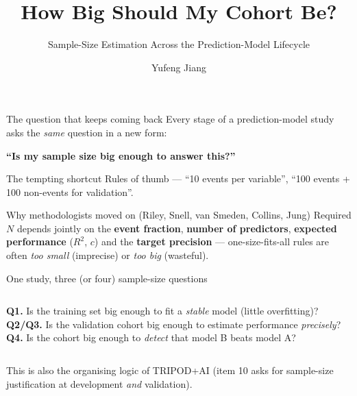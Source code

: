 \documentclass[10pt,aspectratio=169]{beamer}
\title{How Big Should My Cohort Be?}
\subtitle{Sample-Size Estimation Across the Prediction-Model Lifecycle}
\author{Yufeng Jiang}
\date{}
\institute{Binary-outcome clinical prediction models (e.g.\ pCR)}
\newcommand{\stagechip}[2]{\textcolor{#1}{\textbf{#2}}}
\begin{document}
\maketitle

\begin{frame}{The question that keeps coming back}
  Every stage of a prediction-model study asks the \emph{same} question in a new form:
  \begin{center}\Large\textbf{``Is my sample size big enough to answer this?''}\end{center}
  \pause
  \begin{alertblock}{The tempting shortcut}
    Rules of thumb --- ``10 events per variable'', ``100 events + 100 non-events for validation''.
  \end{alertblock}
  \pause
  \begin{block}{Why methodologists moved on (Riley, Snell, van Smeden, Collins, Jung)}
    Required $N$ depends jointly on the \textbf{event fraction}, \textbf{number of predictors},
    \textbf{expected performance} ($R^2$, $c$) and the \textbf{target precision} ---
    one-size-fits-all rules are often \emph{too small} (imprecise) or \emph{too big} (wasteful).
  \end{block}
\end{frame}

\begin{frame}{One study, three (or four) sample-size questions}
  \centering
  \vfill
  \begin{columns}[t]
    \footnotesize
      \stagechip{devcol}{Q1.} Is the training set big enough to fit a \emph{stable} model (little overfitting)?
    \footnotesize
      \stagechip{valcol}{Q2/Q3.} Is the validation cohort big enough to estimate performance \emph{precisely}?
    \footnotesize
      \stagechip{cmpcol}{Q4.} Is the cohort big enough to \emph{detect} that model B beats model A?
  \end{columns}
  \vfill
  {\scriptsize This is also the organising logic of TRIPOD+AI (item 10 asks for sample-size justification at development \emph{and} validation).}
\end{frame}
\end{document}
